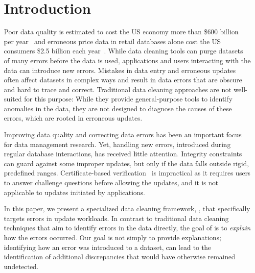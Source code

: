 
\section{Introduction}
\label{s:intro}

Poor data quality is estimated to cost the US economy more than \$600 billion
per year~\cite{eckerson2002} and erroneous price data in retail databases
alone cost the US consumers \$2.5 billion each year~\cite{Fan2008}. While data
cleaning tools can purge datasets of many errors before the data is used,
applications and users interacting with the data can introduce new errors.
Mistakes in data entry and erroneous updates often affect datasets in complex
ways and result in data errors that are obscure and hard to trace and correct.
Traditional data cleaning approaches are not well-suited for this purpose:
While they provide general-purpose tools to identify anomalies in the data,
they are not designed to diagnose the causes of these errors, which are rooted
in erroneous updates.

Improving data quality and correcting data errors has been an important focus
for data management research. Yet, handling new errors, introduced during
regular database interactions, has received little attention. Integrity
constraints~\cite{Khoussainova2006} can guard against some improper updates,
but only if the data falls outside rigid, predefined ranges. Certificate-based
verification~\cite{Chen2011} is impractical as it requires users to answer
challenge questions before allowing the updates, and it is not applicable to
updates initiated by applications.

In this paper, we present a specialized data cleaning framework, \sys, that
specifically targets errors in update workloads. In contrast to traditional
data cleaning techniques that aim to identify errors in the data directly, the
goal of \sys is to \emph{explain} how the errors occurred. Our goal is not
simply to provide explanations; identifying how an error was introduced to a
dataset, can lead to the identification of additional discrepancies that would
have otherwise remained undetected.


